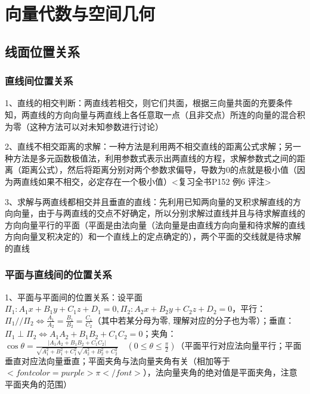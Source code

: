 \chapter{向量代数与空间几何}

\section{线面位置关系}



\subsection{直线间位置关系}

1、直线的相交判断：两直线若相交，则它们共面，根据三向量共面的充要条件知，两直线的方向向量与两直线上各任意取一点（且非交点）所连的向量的混合积为零（这种方法可以对未知参数进行讨论）

2、直线不相交距离的求解：一种方法是利用两不相交直线的距离公式求解；另一种方法是多元函数极值法，利用参数式表示出两直线的方程，求解参数式之间的距离（距离公式），然后将距离分别对两个参数求偏导，导数为0的点就是极小值（因为两直线如果不相交，必定存在一个极小值）<复习全书P152 例6 评注>

3、求解与两直线都相交并且垂直的直线：先利用已知两向量的叉积求解直线的方向向量，由于与两直线的交点不好确定，所以分别求解过直线并且与待求解直线的方向向量平行的平面（平面是由法向量（法向量是由直线方向向量和待求解的直线方向向量叉积决定的）和一个直线上的定点确定的），两个平面的交线就是待求解的直线



\subsection{平面与直线间的位置关系}

1、平面与平面间的位置关系：设平面$ \Pi_{1}: A_{1} x+B_{1} y+C_{1} z+D_{1}=0, \Pi_{2}: A_{2} x+B_{2} y+C_{2} z+D_{2}=0 $，平行：$ \Pi_{1} / / \Pi_{2} \Leftrightarrow \frac{A_{1}}{A_{2}}=\frac{B_{1}}{B_{2}}=\frac{C_{1}}{C_{2}} $（其中若某分母为零, 理解对应的分子也为零）；垂直：$ \Pi_{1} \perp \Pi_{2} \Leftrightarrow A_{1} A_{2}+B_{1} B_{2}+C_{1} C_{2}=0 $；夹角：$ \cos \theta=\frac{\left|A_{1} A_{2}+B_{1} B_{2}+C_{1} C_{2}\right|}{\sqrt{A_{1}^{2}+B_{1}^{2}+C_{1}^{2}} \sqrt{A_{2}^{2}+B_{2}^{2}+C_{2}^{2}}} \quad\left(0 \leqslant \theta \leqslant \frac{\pi}{2}\right) $（平面平行对应法向量平行；平面垂直对应法向量垂直；平面夹角与法向量夹角有关（相加等于$ <font color=purple>\pi</font> $），法向量夹角的绝对值是平面夹角，注意平面夹角的范围）

